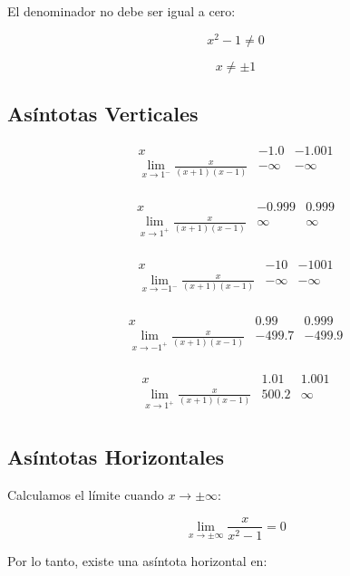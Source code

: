 El denominador no debe ser igual a cero:

\[
x^2 - 1 \neq 0
\]

\[
x \neq \pm 1
\]

\subsection*{Asíntotas Verticales}

\[
\begin{array}{c|c|c}
x & -1.0 & -1.001 \\
\hline
\lim_{x \to 1^-} \frac{x}{(x+1)(x-1)} & -\infty & -\infty \\
\end{array}
\]

\[
\begin{array}{c|c|c}
x & -0.999 & 0.999 \\
\hline
\lim_{x \to 1^+} \frac{x}{(x+1)(x-1)} & \infty & \infty \\
\end{array}
\]

\[
\begin{array}{c|c|c}
x & -10 & -1001 \\
\hline
\lim_{x \to -1^-} \frac{x}{(x+1)(x-1)} & -\infty & -\infty \\
\end{array}
\]

\[
\begin{array}{c|c|c}
x & 0.99 & 0.999 \\
\hline
\lim_{x \to -1^+} \frac{x}{(x+1)(x-1)} & -499.7 & -499.9 \\
\end{array}
\]

\[
\begin{array}{c|c|c}
x & 1.01 & 1.001 \\
\hline
\lim_{x \to 1^+} \frac{x}{(x+1)(x-1)} & 500.2 & \infty \\
\end{array}
\]



\subsection*{Asíntotas Horizontales}

Calculamos el límite cuando $x \to \pm \infty$:

\[
\lim_{x \to \pm \infty} \frac{x}{x^2 - 1} = 0
\]

Por lo tanto, existe una asíntota horizontal en:

